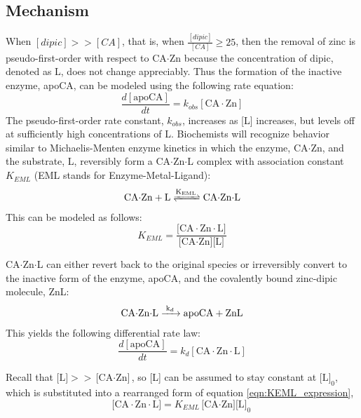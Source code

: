 \subsection{Mechanism}
When $[dipic] >> [CA]$, that is, when $\frac{[dipic]}{[CA]} \ge 25$, then the removal of zinc is pseudo-first-order with respect to CA$\cdot$Zn because the concentration of dipic, denoted as L, does not change appreciably. Thus the formation of the inactive enzyme, apoCA, can be modeled using the following rate equation:
\begin{equation}\label{eqn:apoCA_kobs}
\frac{d[\text{apoCA}]}{dt}=k_{obs}[\text{CA$\cdot$Zn}]
\end{equation}
The pseudo-first-order rate constant, $k_{obs}$, increases as [L] increases, but levels off at sufficiently high concentrations of L. Biochemists will recognize behavior similar to Michaelis-Menten enzyme kinetics in which the enzyme, CA$\cdot$Zn, and the substrate, L, reversibly form a CA$\cdot$Zn$\cdot$L complex with association constant $K_{EML}$ (EML stands for Enzyme-Metal-Ligand):
\begin{align}\label{eqn:KEML_reaction}
\ce{CA$\cdot$Zn + L
<=>[\ce{K_{EML}}]
CA$\cdot$Zn$\cdot$L}
\end{align}
This can be modeled as follows:
\begin{equation}\label{eqn:KEML_expression}
K_{EML}=\frac{\text{[CA$\cdot$Zn$\cdot$L]}}{\text{[CA$\cdot$Zn][L]}}
\end{equation}

CA$\cdot$Zn$\cdot$L can either revert back to the original species or irreversibly convert to the inactive form of the enzyme, apoCA, and the covalently bound zinc-dipic molecule, ZnL:
\begin{align}\label{eqn:kd_reaction}
\ce{CA$\cdot$Zn$\cdot$L
->[\ce{k_{d}}]
apoCA + ZnL}
\end{align}
This yields the following differential rate law:
\begin{equation}\label{eqn:kd_expression}
\frac{d[\text{apoCA}]}{dt}=k_{d}[\text{CA$\cdot$Zn$\cdot$L}]
\end{equation}

Recall that $\text{[L]} >> \text{[CA$\cdot$Zn]}$, so [L] can be assumed to stay constant at $\text{[L]}_0$, which is substituted into a rearranged form of equation \eqref{eqn:KEML_expression},
\begin{equation}\label{eqn:KEML_expression_constant_L}
\text{[CA$\cdot$Zn$\cdot$L]}=K_{EML}\text{[CA$\cdot$Zn][L]}_0
\end{equation}

